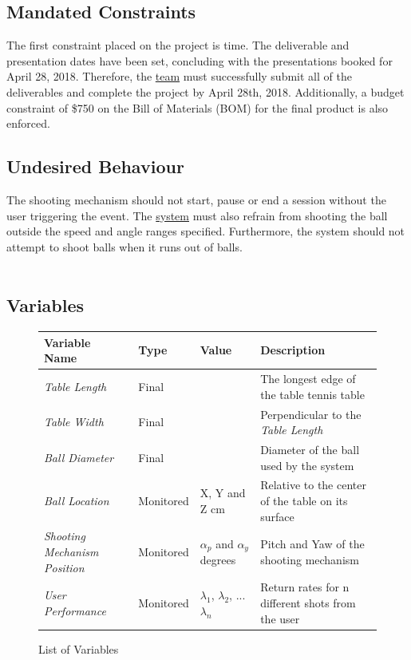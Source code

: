 \documentclass[11pt]{article}
\begin{document}
\subsection{Mandated Constraints}
The first constraint placed on the project is time. The deliverable and presentation dates have been set, concluding with the presentations booked for April 28, 2018. Therefore, the \hyperref[sec:definitions]{team} must successfully submit all of the deliverables and complete the project by April 28th, 2018. Additionally, a budget constraint of \$750 on the Bill of Materials (BOM) for the final product is also enforced.
\subsection{Undesired Behaviour} 
The shooting mechanism should not start, pause or end a session without the user triggering the event. The \hyperref[sec:definitions]{system} must also refrain from shooting the ball outside the speed and angle ranges specified. Furthermore, the system should not attempt to shoot balls when it runs out of balls. \\\\

\subsection{Variables}
\begin{figure}[H]
   \centering
   \noindent\begin{tabularx}{\textwidth}{| >{\centering\arraybackslash}m{} | >{\centering\arraybackslash}m{} | >{\centering\arraybackslash}m{} | >{\centering\arraybackslash}m{} |}
   \hline 
   \textbf{Variable Name} & \textbf{Type} & \textbf{Value} & \textbf{Description} \\ \hline
   \textit{Table Length} & Final & 274cm & The longest edge of the table tennis table \\ \hline
   \textit{Table Width} & Final & 152.5cm & Perpendicular to the \textit{Table Length} \\ \hline
   \textit{Ball Diameter} & Final & 40mm & Diameter of the ball used by the system \\ \hline
   \textit{Ball Location} & Monitored & X, Y and Z cm & Relative to the center of the table on its surface \\ \hline
   \textit{Shooting Mechanism Position} & Monitored & $\alpha_p$ and $\alpha_y$ degrees & Pitch and Yaw of the shooting mechanism \\ \hline
   \textit{User Performance} & Monitored & $\lambda_1$, $\lambda_2$, ... $\lambda_n$ & Return rates for n different shots from the user \\ \hline
 
\end{tabularx}
\caption{List of Variables}
\end{figure}
\end{document}
